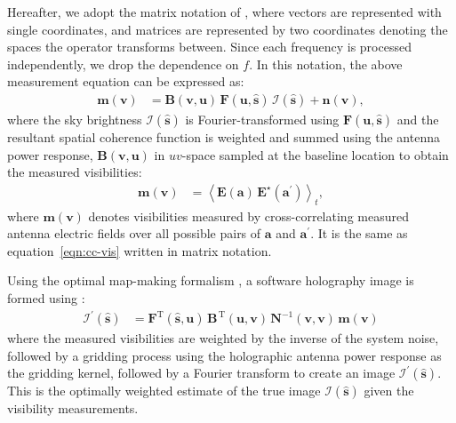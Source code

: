 \documentclass[a4paper,fleqn,usenatbib]{mnras}
\begin{document}
Hereafter, we adopt the matrix notation of \citet{mor11}, where vectors are represented with single coordinates, and matrices are represented by two coordinates denoting the spaces the operator transforms between. Since each frequency is processed independently, we drop the dependence on $f$. In this notation, the above measurement equation can be expressed as:
\begin{align}
  \mathbf{m}(\mathbf{v}) &= \mathbf{B}(\mathbf{v},\mathbf{u})\,\mathbf{F}(\mathbf{u},\hat{\mathbf{s}})\,\boldsymbol{\mathcal{I}}(\hat{\mathbf{s}}) + \mathbf{n}(\mathbf{v}),
\end{align}
where the sky brightness $\boldsymbol{\mathcal{I}}(\hat{\mathbf{s}})$ is Fourier-transformed using $\mathbf{F}(\mathbf{u},\hat{\mathbf{s}})$ and the resultant spatial coherence function is weighted and summed using the antenna power response, $\mathbf{B}(\mathbf{v},\mathbf{u})$ in $uv$-space sampled at the baseline location to obtain the measured visibilities:
\begin{align}
  \mathbf{m}(\mathbf{v}) &= \left\langle \mathbf{E}(\mathbf{a})\,\mathbf{E}^\star(\mathbf{a}^\prime)\right\rangle_t, \label{eqn:matrix-cc-vis}
\end{align}
where $\mathbf{m}(\mathbf{v})$ denotes visibilities measured by cross-correlating measured antenna electric fields over all possible pairs of $\mathbf{a}$ and $\mathbf{a}^\prime$. It is the same as equation~\ref{eqn:cc-vis} written in matrix notation.

Using the optimal map-making formalism \citep{teg97a,teg97b}, a software holography image is formed using \citep{mor09}:
\begin{align}
  \boldsymbol{\mathcal{I}}^\prime(\hat{\mathbf{s}}) &= \mathbf{F}^\textrm{T}(\hat{\mathbf{s}},\mathbf{u})\,\mathbf{B}^{\,\textrm{T}}(\mathbf{u},\mathbf{v})\,\mathbf{N}^{-1}(\mathbf{v},\mathbf{v})\,\mathbf{m}(\mathbf{v}) \label{eqn:dirty-image-FX}
\end{align}
where the measured visibilities are weighted by the inverse of the system noise, followed by a gridding process using the holographic antenna power response as the gridding kernel, followed by a Fourier transform to create an image $\boldsymbol{\mathcal{I}}^\prime(\hat{\mathbf{s}})$. This is the optimally weighted estimate of the true image $\boldsymbol{\mathcal{I}}(\hat{\mathbf{s}})$ given the visibility measurements.
\end{document}
